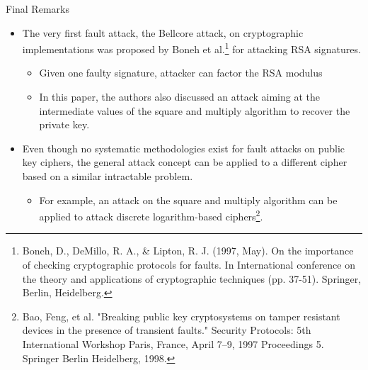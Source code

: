 \begin{frame}{Final Remarks}
    \begin{itemize}
        \item The very first fault attack, the Bellcore attack, on cryptographic implementations was proposed by Boneh et al.\footnote{Boneh, D., DeMillo, R. A., \& Lipton, R. J. (1997, May). On the importance of checking cryptographic protocols for faults. In International conference on the theory and applications of cryptographic techniques (pp. 37-51). Springer, Berlin, Heidelberg.} for attacking RSA signatures.
        \begin{itemize}
            \item Given one faulty signature, attacker can factor the RSA modulus
            \item In this paper, the authors also discussed an attack aiming at the intermediate values of the square and multiply algorithm to recover the private key.
        \end{itemize}
        \item Even though no systematic methodologies exist for fault attacks on public key ciphers, the general attack concept can be applied to a different cipher based on a similar intractable problem.
        \begin{itemize}
            \item For example, an attack on the square and multiply algorithm can be applied to attack discrete logarithm-based ciphers\footnote{Bao, Feng, et al. "Breaking public key cryptosystems on tamper resistant devices in the presence of transient faults." Security Protocols: 5th International Workshop Paris, France, April 7–9, 1997 Proceedings 5. Springer Berlin Heidelberg, 1998.}.
        \end{itemize}
    \end{itemize}
\end{frame}